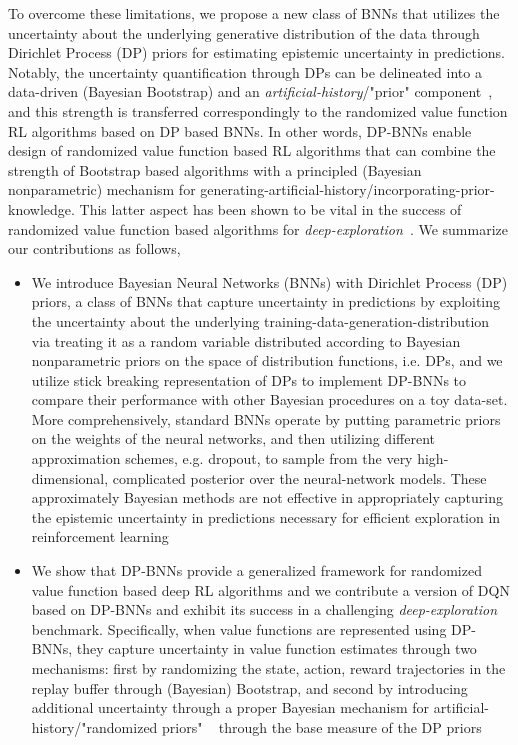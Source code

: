 \documentclass[10pt]{article}
\begin{document}
To overcome these limitations,  we propose a new class of BNNs that utilizes the uncertainty about the underlying generative distribution of the data through Dirichlet Process (DP) priors for estimating epistemic uncertainty  in predictions. Notably, the  uncertainty quantification through DPs can be delineated into a data-driven (Bayesian Bootstrap) and an \textit{artificial-history}/"prior" component~\citep{vashishtha2026bayesian, vashishtha2025leveraging}, and this strength is transferred correspondingly to the randomized value function RL algorithms based on  DP based BNNs. In other words, DP-BNNs enable design of randomized value function based RL algorithms that can combine the strength of Bootstrap based algorithms \citep{osband2016deep} with a principled (Bayesian nonparametric) mechanism for generating-artificial-history/incorporating-prior-knowledge. This latter aspect has been shown to be vital in the success of randomized value function based algorithms for \textit{deep-exploration}~\citep{osband2015bootstrapped, osband2018randomized}. We summarize our contributions as follows, 

\begin{itemize}
    \item We introduce  Bayesian Neural Networks (BNNs) with Dirichlet Process (DP) priors, a class of BNNs that capture uncertainty in predictions by exploiting the uncertainty about the underlying training-data-generation-distribution via treating it as a random variable distributed according to Bayesian nonparametric priors on the space of  distribution functions, i.e. DPs, and we utilize stick breaking representation of DPs to implement DP-BNNs to compare their performance with other Bayesian procedures on a toy data-set. More comprehensively,  standard BNNs operate by putting parametric priors on the weights of the neural networks, and then utilizing different approximation schemes, e.g. dropout, to sample from  the very high-dimensional, complicated posterior over the neural-network models. These approximately Bayesian methods are not effective in appropriately capturing the epistemic uncertainty in predictions necessary for efficient exploration in reinforcement learning ~\citep{osband2018randomized} 

    \item  We show that DP-BNNs provide a generalized framework for randomized value function based deep RL algorithms and we contribute a version of DQN based on DP-BNNs and exhibit its success in a challenging \textit{deep-exploration} benchmark. Specifically, when value functions are represented using DP-BNNs, they capture uncertainty in value function estimates through two mechanisms: first by randomizing the state, action, reward trajectories in the replay buffer through (Bayesian) Bootstrap, and second by introducing additional uncertainty through a proper Bayesian mechanism for artificial-history/"randomized priors" ~\citep{osband2018randomized}
    through the base measure of the DP priors
\end{itemize}
\end{document}
